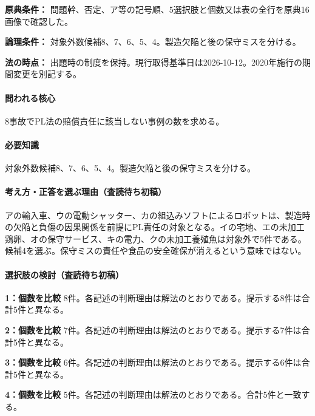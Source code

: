 \noindent\textbf{原典条件：} 問題幹、否定、ア等の記号順、5選択肢と個数又は表の全行を原典16画像で確認した。\par

\noindent\textbf{論理条件：} 対象外数候補8、7、6、5、4。製造欠陥と後の保守ミスを分ける。\par

\noindent\textbf{法の時点：} 出題時の制度を保持。現行取得基準日は2026-10-12。2020年施行の期間変更を別記する。\par

\paragraph{問われる核心} 8事故でPL法の賠償責任に該当しない事例の数を求める。

\paragraph{必要知識} 対象外数候補8、7、6、5、4。製造欠陥と後の保守ミスを分ける。

\paragraph{考え方・正答を選ぶ理由（査読待ち初稿）} アの輸入車、ウの電動シャッター、カの組込みソフトによるロボットは、製造時の欠陥と負傷の因果関係を前提にPL責任の対象となる。イの宅地、エの未加工鶏卵、オの保守サービス、キの電力、クの未加工養殖魚は対象外で5件である。候補4を選ぶ。保守ミスの責任や食品の安全確保が消えるという意味ではない。

\paragraph{選択肢の検討（査読待ち初稿）}\mbox{}\par

\noindent\textbf{1：個数を比較} 8件。各記述の判断理由は解法のとおりである。提示する8件は合計5件と異なる。\par

\noindent\textbf{2：個数を比較} 7件。各記述の判断理由は解法のとおりである。提示する7件は合計5件と異なる。\par

\noindent\textbf{3：個数を比較} 6件。各記述の判断理由は解法のとおりである。提示する6件は合計5件と異なる。\par

\noindent\textbf{4：個数を比較} 5件。各記述の判断理由は解法のとおりである。合計5件と一致する。\par

